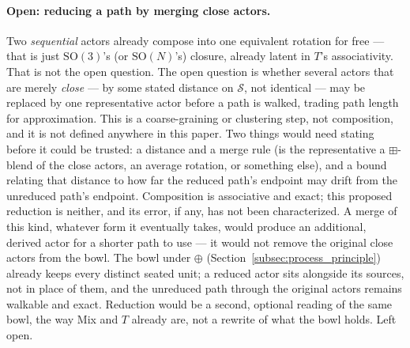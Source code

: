 \documentclass[12pt, a4paper]{article}
\begin{document}
\paragraph{Open: reducing a path by merging close actors.} Two
\emph{sequential} actors already compose into one equivalent rotation
for free --- that is just $\mathrm{SO}(3)$'s (or $\mathrm{SO}(N)$'s)
closure, already latent in $T$'s associativity. That is not the open
question. The open question is whether several actors that are
merely \emph{close} --- by some stated distance on $\mathcal{S}$, not
identical --- may be replaced by one representative actor before a
path is walked, trading path length for approximation. This is a
coarse-graining or clustering step, not composition, and it is not
defined anywhere in this paper. Two things would need stating before
it could be trusted: a distance and a merge rule (is the
representative a $\boxplus$-blend of the close actors, an average
rotation, or something else), and a bound relating that distance to
how far the reduced path's endpoint may drift from the unreduced
path's endpoint. Composition is associative and exact;
this proposed reduction is neither, and its error, if any, has not
been characterized.
A merge of this kind, whatever form it eventually takes, would
produce an additional, derived actor for a shorter path to use --- it
would not remove the original close actors from the bowl. The bowl
under $\oplus$ (Section~\ref{subsec:process_principle}) already keeps
every distinct seated unit; a reduced actor sits alongside its
sources, not in place of them, and the unreduced path through the
original actors remains walkable and exact. Reduction would be a
second, optional reading of the same bowl, the way Mix and $T$
already are, not a rewrite of what the bowl holds. Left open.
\end{document}
